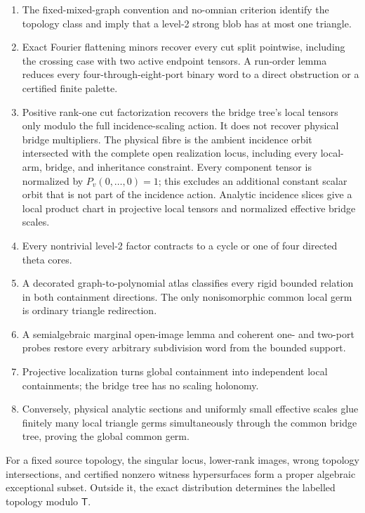\documentclass[11pt]{article}
\newcommand{\Tmove}{\mathsf T}
\begin{document}
\begin{enumerate}[label=\textbf{P\arabic*.}]
\item The fixed-mixed-graph convention and no-omnian criterion identify the
      topology class and imply that a level-2 strong blob has at most one
      triangle.
\item Exact Fourier flattening minors recover every cut split pointwise,
      including the crossing case with two active endpoint tensors.  A
      run-order lemma reduces every four-through-eight-port binary word to a
      direct obstruction or a certified finite palette.
\item Positive rank-one cut factorization recovers the bridge tree's local
      tensors only modulo the full incidence-scaling action.  It does not
      recover physical bridge multipliers.  The physical fibre is the ambient
      incidence orbit intersected with the complete open realization locus,
      including every local-arm, bridge, and inheritance constraint.
      Every component tensor is normalized by
      $P_v(0,\ldots,0)=1$; this excludes an additional constant scalar orbit
      that is not part of the incidence action.
      Analytic incidence slices give a local product chart in projective
      local tensors and normalized effective bridge scales.
\item Every nontrivial level-2 factor contracts to a cycle or one of four
      directed theta cores.
\item A decorated graph-to-polynomial atlas classifies every rigid bounded
      relation in both containment directions.  The only nonisomorphic common
      local germ is ordinary triangle redirection.
\item A semialgebraic marginal open-image lemma and coherent one- and two-port probes restore every
      arbitrary subdivision word from the bounded support.
\item Projective localization turns global containment into independent local
      containments; the bridge tree has no scaling holonomy.
\item Conversely, physical analytic sections and uniformly small effective
      scales glue finitely many local triangle germs simultaneously through
      the common bridge tree, proving the global common germ.
\end{enumerate}

For a fixed source topology, the singular locus, lower-rank images, wrong
topology intersections, and certified nonzero witness hypersurfaces form a
proper algebraic exceptional subset.  Outside it, the exact distribution
determines the labelled topology modulo $\Tmove$.
\end{document}

